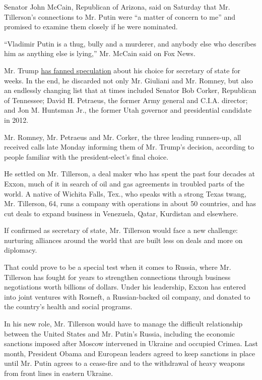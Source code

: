 Senator John McCain, Republican of Arizona, said on Saturday that Mr.
Tillerson's connections to Mr. Putin were ``a matter of concern to me''
and promised to examine them closely if he were nominated.

``Vladimir Putin is a thug, bully and a murderer, and anybody else who
describes him as anything else is lying,'' Mr. McCain said on Fox News.

Mr. Trump
\href{https://www.nytimes3xbfgragh.onion/2016/11/24/us/politics/donald-trump-mitt-romney-rudy-giuliani-state.html}{has
fanned speculation} about his choice for secretary of state for weeks.
In the end, he discarded not only Mr. Giuliani and Mr. Romney, but also
an endlessly changing list that at times included Senator Bob Corker,
Republican of Tennessee; David H. Petraeus, the former Army general and
C.I.A. director; and Jon M. Huntsman Jr., the former Utah governor and
presidential candidate in 2012.

Mr. Romney, Mr. Petraeus and Mr. Corker, the three leading runners-up,
all received calls late Monday informing them of Mr. Trump's decision,
according to people familiar with the president-elect's final choice.

He settled on Mr. Tillerson, a deal maker who has spent the past four
decades at Exxon, much of it in search of oil and gas agreements in
troubled parts of the world. A native of Wichita Falls, Tex., who speaks
with a strong Texas twang, Mr. Tillerson, 64, runs a company with
operations in about 50 countries, and has cut deals to expand business
in Venezuela, Qatar, Kurdistan and elsewhere.

If confirmed as secretary of state, Mr. Tillerson would face a new
challenge: nurturing alliances around the world that are built less on
deals and more on diplomacy.

That could prove to be a special test when it comes to Russia, where Mr.
Tillerson has fought for years to strengthen connections through
business negotiations worth billions of dollars. Under his leadership,
Exxon has entered into joint ventures with Rosneft, a Russian-backed oil
company, and donated to the country's health and social programs.

In his new role, Mr. Tillerson would have to manage the difficult
relationship between the United States and Mr. Putin's Russia, including
the economic sanctions imposed after Moscow intervened in Ukraine and
occupied Crimea. Last month, President Obama and European leaders agreed
to keep sanctions in place until Mr. Putin agrees to a cease-fire and to
the withdrawal of heavy weapons from front lines in eastern Ukraine.

